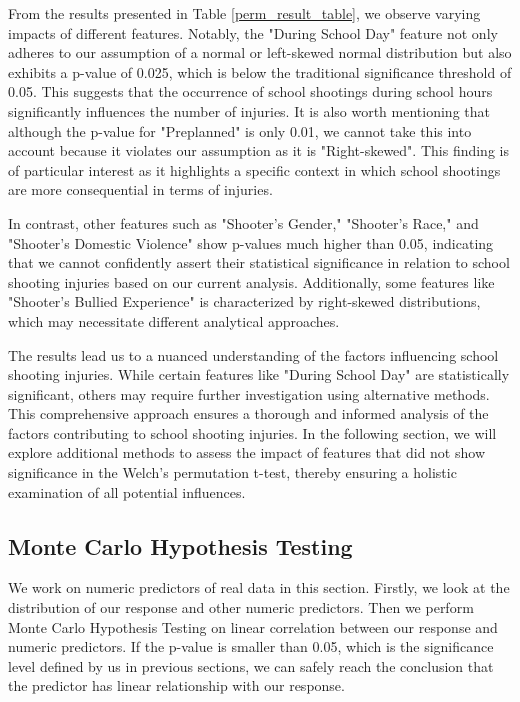 \documentclass[12pt]{article}
\numberwithin{figure}{section}
\begin{document}
From the results presented in Table \ref{perm_result_table}, we observe varying impacts of different features. Notably, the "During School Day" feature not only adheres to our assumption of a normal or left-skewed normal distribution but also exhibits a p-value of 0.025, which is below the traditional significance threshold of 0.05. This suggests that the occurrence of school shootings during school hours significantly influences the number of injuries. It is also worth mentioning that although the p-value for "Preplanned" is only 0.01, we cannot take this into account because it violates our assumption as it is "Right-skewed". This finding is of particular interest as it highlights a specific context in which school shootings are more consequential in terms of injuries.

In contrast, other features such as "Shooter's Gender," "Shooter's Race," and "Shooter's Domestic Violence" show p-values much higher than 0.05, indicating that we cannot confidently assert their statistical significance in relation to school shooting injuries based on our current analysis. Additionally, some features like "Shooter's Bullied Experience" is characterized by right-skewed distributions, which may necessitate different analytical approaches.

The results lead us to a nuanced understanding of the factors influencing school shooting injuries. While certain features like "During School Day" are statistically significant, others may require further investigation using alternative methods. This comprehensive approach ensures a thorough and informed analysis of the factors contributing to school shooting injuries. In the following section, we will explore additional methods to assess the impact of features that did not show significance in the Welch’s permutation t-test, thereby ensuring a holistic examination of all potential influences.

\subsection{Monte Carlo Hypothesis Testing}

We work on numeric predictors of real data in this section. Firstly, we look at the distribution of our response and other numeric predictors. Then we perform Monte Carlo Hypothesis Testing on linear correlation between our response and numeric predictors. If the p-value is smaller than 0.05, which is the significance level defined by us in previous sections, we can safely reach the conclusion that the predictor has linear relationship with our response.
\end{document}
